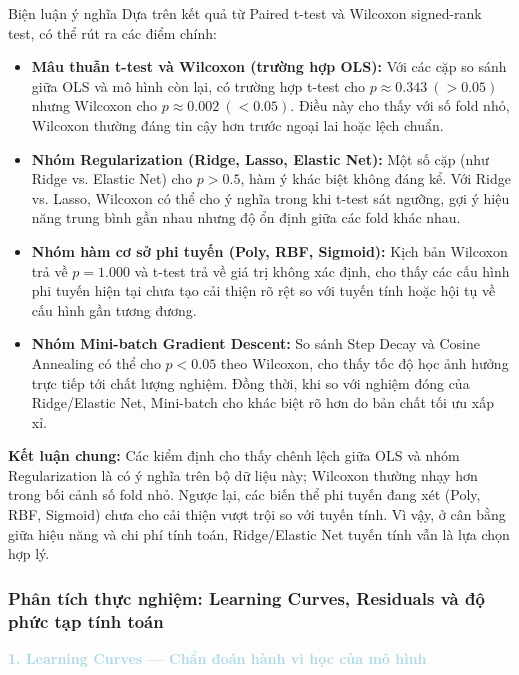 \begin{warningbox}{Biện luận ý nghĩa}
Dựa trên kết quả từ Paired t-test và Wilcoxon signed-rank test, có thể rút ra các điểm chính:
\begin{itemize}
    \item \textbf{Mâu thuẫn t-test và Wilcoxon (trường hợp OLS):} Với các cặp so sánh giữa OLS và mô hình còn lại, có trường hợp t-test cho $p\approx 0.343\ (>0.05)$ nhưng Wilcoxon cho $p\approx 0.002\ (<0.05)$. Điều này cho thấy với số fold nhỏ, Wilcoxon thường đáng tin cậy hơn trước ngoại lai hoặc lệch chuẩn.

    \item \textbf{Nhóm Regularization (Ridge, Lasso, Elastic Net):} Một số cặp (như Ridge vs. Elastic Net) cho $p>0.5$, hàm ý khác biệt không đáng kể. Với Ridge vs. Lasso, Wilcoxon có thể cho ý nghĩa trong khi t-test sát ngưỡng, gợi ý hiệu năng trung bình gần nhau nhưng độ ổn định giữa các fold khác nhau.

    \item \textbf{Nhóm hàm cơ sở phi tuyến (Poly, RBF, Sigmoid):} Kịch bản Wilcoxon trả về $p=1.000$ và t-test trả về giá trị không xác định, cho thấy các cấu hình phi tuyến hiện tại chưa tạo cải thiện rõ rệt so với tuyến tính hoặc hội tụ về cấu hình gần tương đương.

    \item \textbf{Nhóm Mini-batch Gradient Descent:} So sánh Step Decay và Cosine Annealing có thể cho $p<0.05$ theo Wilcoxon, cho thấy tốc độ học ảnh hưởng trực tiếp tới chất lượng nghiệm. Đồng thời, khi so với nghiệm đóng của Ridge/Elastic Net, Mini-batch cho khác biệt rõ hơn do bản chất tối ưu xấp xỉ.
\end{itemize}
\end{warningbox}

\textbf{Kết luận chung:} Các kiểm định cho thấy chênh lệch giữa OLS và nhóm Regularization là có ý nghĩa trên bộ dữ liệu này; Wilcoxon thường nhạy hơn trong bối cảnh số fold nhỏ. Ngược lại, các biến thể phi tuyến đang xét (Poly, RBF, Sigmoid) chưa cho cải thiện vượt trội so với tuyến tính. Vì vậy, ở cân bằng giữa hiệu năng và chi phí tính toán, Ridge/Elastic Net tuyến tính vẫn là lựa chọn hợp lý.

\subsubsection{Phân tích thực nghiệm: Learning Curves, Residuals và độ phức tạp tính toán}

\noindent\textcolor{lightblue}{\textbf{1. Learning Curves --- Chẩn đoán hành vi học của mô hình}}

